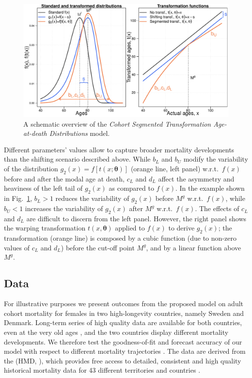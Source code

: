 \documentclass[11pt, a4paper]{article}
\begin{document}
\begin{figure}[t]
	\begin{center}
		\includegraphics[scale=0.57]{./Figures/F1.pdf} 
		\caption{A schematic overview of the \emph{Cohort Segmented Transformation Age-at-death Distributions} model.\label{Fig:CSTADmodel}}    
	\end{center}
\end{figure}

Different parameters' values allow to capture broader mortality developments than the shifting scenario described above. While $b_L$ and $b_U$ modify the variability of the distribution $g_2(x)=f\left[t(x;\bm{\theta})\right]$ (orange line, left panel) w.r.t.~$f(x)$ before and after the modal age at death, $c_L$ and $d_L$ affect the asymmetry and heaviness of the left tail of $g_2(x)$ as compared to $f(x)$. In the example shown in Fig.~\ref{Fig:CSTADmodel}, $b_L > 1$ reduces the variability of $g_2(x)$ before $M^g$ w.r.t.~$f(x)$, while $b_U < 1$ increases the variability of $g_2(x)$ after $M^g$ w.r.t.~$f(x)$. The effects of $c_L$ and $d_L$ are difficult to discern from the left panel. However, the right panel shows the warping transformation $t(x,\bm{\theta})$ applied to $f(x)$ to derive $g_2(x)$; the transformation (orange line) is composed by a cubic function (due to non-zero values of $c_L$ and $d_L$) before the cut-off point $M^g$, and by a linear function above $M^g$.

\subsection{Data}
\label{Subsec:Data}
For illustrative purposes we present outcomes from the proposed model on adult cohort mortality for females in two high-longevity countries, namely Sweden and Denmark. Long-term series of high quality data are available for both countries, even at the very old ages \citep{vaupel1994longer,wilmoth1996extreme,AndreevBookDanemark}, and the two countries display different mortality developments. We therefore test the goodness-of-fit and forecast accuracy of our model with respect to different mortality trajectories \citep{ChristensenEtAlDenmarkSwedenDivergence2010}. The data are derived from the \citeauthor{HMD} (HMD, \citeyear{HMD}), which provides free access to detailed, consistent and high quality historical mortality data for 43 different territories and countries \citep{barbieri2015data}.
\end{document}
